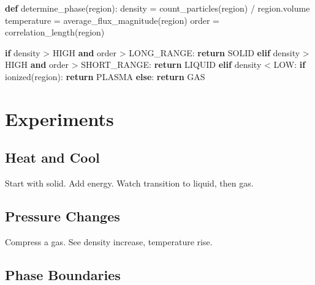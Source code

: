\documentclass[
  11pt,
  letterpaper,
  twoside,
  openright]{book}
\newenvironment{Shaded}{\begin{snugshade}}{\end{snugshade}}
\newcommand{\ControlFlowTok}[1]{\textcolor[rgb]{0.00,0.23,0.31}{\textbf{#1}}}
\newcommand{\KeywordTok}[1]{\textcolor[rgb]{0.00,0.23,0.31}{\textbf{#1}}}
\newcommand{\NormalTok}[1]{\textcolor[rgb]{0.00,0.23,0.31}{#1}}
\newcommand{\OperatorTok}[1]{\textcolor[rgb]{0.37,0.37,0.37}{#1}}
\begin{document}
\begin{Shaded}
\begin{Highlighting}[]
\KeywordTok{def}\NormalTok{ determine\_phase(region):}
\NormalTok{    density }\OperatorTok{=}\NormalTok{ count\_particles(region) }\OperatorTok{/}\NormalTok{ region.volume}
\NormalTok{    temperature }\OperatorTok{=}\NormalTok{ average\_flux\_magnitude(region)}
\NormalTok{    order }\OperatorTok{=}\NormalTok{ correlation\_length(region)}

    \ControlFlowTok{if}\NormalTok{ density }\OperatorTok{\textgreater{}}\NormalTok{ HIGH }\KeywordTok{and}\NormalTok{ order }\OperatorTok{\textgreater{}}\NormalTok{ LONG\_RANGE:}
        \ControlFlowTok{return}\NormalTok{ SOLID}
    \ControlFlowTok{elif}\NormalTok{ density }\OperatorTok{\textgreater{}}\NormalTok{ HIGH }\KeywordTok{and}\NormalTok{ order }\OperatorTok{\textgreater{}}\NormalTok{ SHORT\_RANGE:}
        \ControlFlowTok{return}\NormalTok{ LIQUID}
    \ControlFlowTok{elif}\NormalTok{ density }\OperatorTok{\textless{}}\NormalTok{ LOW:}
        \ControlFlowTok{if}\NormalTok{ ionized(region):}
            \ControlFlowTok{return}\NormalTok{ PLASMA}
        \ControlFlowTok{else}\NormalTok{:}
            \ControlFlowTok{return}\NormalTok{ GAS}
\end{Highlighting}
\end{Shaded}

\section{Experiments}\label{experiments-8}

\subsection{Heat and Cool}\label{heat-and-cool}

Start with solid. Add energy. Watch transition to liquid, then gas.

\subsection{Pressure Changes}\label{pressure-changes}

Compress a gas. See density increase, temperature rise.

\subsection{Phase Boundaries}\label{phase-boundaries}
\end{document}
